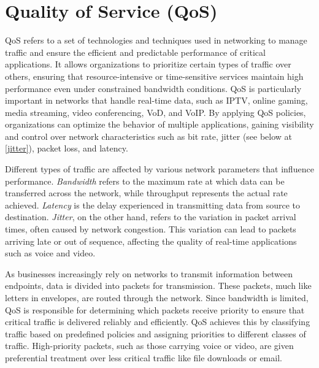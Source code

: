 \section{Quality of Service (QoS)}

\ac{QoS} refers to a set of technologies and techniques used in networking to manage traffic and ensure the efficient and predictable performance of critical applications. It allows organizations to prioritize certain types of traffic over others, ensuring that resource-intensive or time-sensitive services maintain high performance even under constrained bandwidth conditions. QoS is particularly important in networks that handle real-time data, such as \ac{IPTV}, online gaming, media streaming, video conferencing, \ac{VoD}, and \ac{VoIP}. By applying QoS policies, organizations can optimize the behavior of multiple applications, gaining visibility and control over network characteristics such as bit rate, jitter (see below at \ref{jitter}), packet loss, and latency.\cite{rhim_what_2024}\cite{hpe_juniper_networking_what_nodate}\cite{paloalto_networks_what_nodate}\cite{fortinet_what_nodate}


Different types of traffic are affected by various network parameters that influence performance. \textit{Bandwidth} refers to the maximum rate at which data can be transferred across the network, while throughput represents the actual rate achieved. \textit{Latency} is the delay experienced in transmitting data from source to destination. \textit{Jitter}, on the other hand, refers to the variation in packet arrival times, often caused by network congestion. This variation can lead to packets arriving late or out of sequence, affecting the quality of real-time applications such as voice and video.\label{jitter}\cite{paloalto_networks_what_nodate}\cite{fortinet_what_nodate}


As businesses increasingly rely on networks to transmit information between endpoints, data is divided into packets for transmission. These packets, much like letters in envelopes, are routed through the network. Since bandwidth is limited, QoS is responsible for determining which packets receive priority to ensure that critical traffic is delivered reliably and efficiently. QoS achieves this by classifying traffic based on predefined policies and assigning priorities to different classes of traffic. High-priority packets, such as those carrying voice or video, are given preferential treatment over less critical traffic like file downloads or email.


